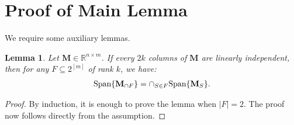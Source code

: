 \documentclass[9pt,twocolumn]{pnas-new}
\newtheorem{lemma}{Lemma}
\newtheorem{remark}{Remark}
\begin{document}




\clearpage

\section{Proof of Main Lemma}

We require some auxiliary lemmas.

\begin{lemma}\label{SpanIntersectionLemma}
Let $\mathbf{M} \in \mathbb{R}^{n \times m}$. If every $2k$ columns of $\mathbf{M}$ are linearly independent, then for any $F \subseteq 2^{[m]}$ of rank $k$, we have:
\begin{align*}
\text{\rm Span}\{\mathbf{M}_{\cap F}\}  = \cap_{S \in F} \text{\rm Span}\{\mathbf{M}_S\}.
\end{align*}
\end{lemma}
\begin{proof}
By induction, it is enough to prove the lemma when $|F| = 2$. The proof now follows directly from the assumption.
\end{proof}
\end{document}
